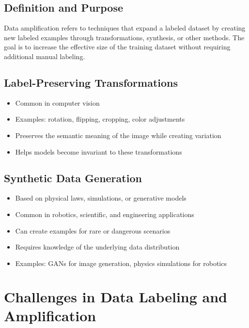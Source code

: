 \documentclass[12pt]{article}
\begin{document}
\subsection{Definition and Purpose}
\begin{tcolorbox}[colback=yellow!5!white,colframe=yellow!75!black,title={Data Amplification}]
Data amplification refers to techniques that expand a labeled dataset by creating new labeled examples through transformations, synthesis, or other methods. The goal is to increase the effective size of the training dataset without requiring additional manual labeling.
\end{tcolorbox}

\subsection{Label-Preserving Transformations}
\begin{itemize}
    \item Common in computer vision
    \item Examples: rotation, flipping, cropping, color adjustments
    \item Preserves the semantic meaning of the image while creating variation
    \item Helps models become invariant to these transformations
\end{itemize}

\subsection{Synthetic Data Generation}
\begin{itemize}
    \item Based on physical laws, simulations, or generative models
    \item Common in robotics, scientific, and engineering applications
    \item Can create examples for rare or dangerous scenarios
    \item Requires knowledge of the underlying data distribution
    \item Examples: GANs for image generation, physics simulations for robotics
\end{itemize}

\section{Challenges in Data Labeling and Amplification}
\end{document}
